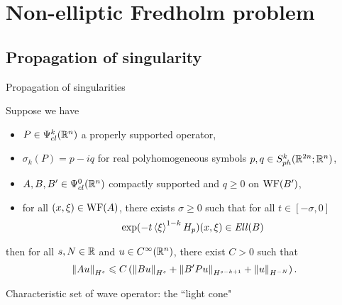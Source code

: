 \documentclass{beamer}
\begin{document}
\section{Non-elliptic Fredholm problem} 
\subsection{Propagation of singularity} 
\begin{frame}{Propagation of singularities}
\begin{theorem} \label{theorem: propagation of singularity estimates}
    Suppose we have 
    \begin{itemize}
        \item $P \in \Psi^k_{cl}(\R^n)$ a properly supported operator,
        \item $\sigma_{k}(P) = p - iq$ for real polyhomogeneous symbols $p, q \in S^{k}_{ph}(\R^{2n}; \R^{n})$, 
        \item $A, B, B' \in \Psi^{0}_{cl}(\R^n)$ compactly supported and $q \geq 0 $ on $\WF(B')$, 
        \item for all $(x, \xi) \in \WF(A)$, there exists $\sigma \geq 0$ such that for all $t \in [-\sigma, 0]$
        \begin{align*}
        \exp(-t\sym[\xi]^{1-k}H_p)(x, \xi) \in \Ell(B)
        \end{align*}
    \end{itemize}
    then for all $s, N \in \R$ and $u \in C^\infty(\R^n)$, there exist $C > 0$ such that 
    \begin{align*}
    \norm[Au]_{H^s} \leq C\brac{\norm[Bu]_{H^s} + \norm[B'Pu]_{H^{s - k + 1}} + \norm[u]_{H^{-N}}}. 
    \end{align*}
\end{theorem}
\end{frame}


\begin{frame}{Characteristic set of wave operator: the ``light cone"}
\begin{center}
\end{center}
\end{frame}
\end{document}
